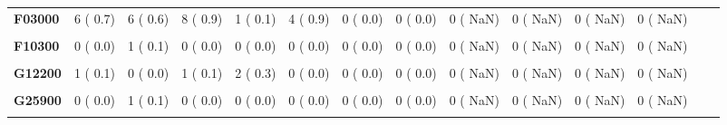\documentclass[
]{article}
\begin{document}
\begin{table}[H]
\begin{tabular}[t]{>{\raggedright\arraybackslash}p{5em}ccccccccccccc}
\textbf{F03000} & 6 (  0.7) & 6 (  0.6) & 8 (  0.9) & 1 (  0.1) & 4 (  0.9) & 0 (  0.0) & 0 (  0.0) & 0 (  NaN) & 0 (  NaN) & 0 (  NaN) & 0 (  NaN) &  & \\
\textbf{\cellcolor{gray!10}{F05900}} & \cellcolor{gray!10}{1 (  0.1)} & \cellcolor{gray!10}{0 (  0.0)} & \cellcolor{gray!10}{0 (  0.0)} & \cellcolor{gray!10}{0 (  0.0)} & \cellcolor{gray!10}{0 (  0.0)} & \cellcolor{gray!10}{0 (  0.0)} & \cellcolor{gray!10}{0 (  0.0)} & \cellcolor{gray!10}{0 (  NaN)} & \cellcolor{gray!10}{0 (  NaN)} & \cellcolor{gray!10}{0 (  NaN)} & \cellcolor{gray!10}{0 (  NaN)} & \cellcolor{gray!10}{} & \cellcolor{gray!10}{}\\
\textbf{F10300} & 0 (  0.0) & 1 (  0.1) & 0 (  0.0) & 0 (  0.0) & 0 (  0.0) & 0 (  0.0) & 0 (  0.0) & 0 (  NaN) & 0 (  NaN) & 0 (  NaN) & 0 (  NaN) &  & \\
\textbf{\cellcolor{gray!10}{G06000}} & \cellcolor{gray!10}{1 (  0.1)} & \cellcolor{gray!10}{0 (  0.0)} & \cellcolor{gray!10}{0 (  0.0)} & \cellcolor{gray!10}{0 (  0.0)} & \cellcolor{gray!10}{0 (  0.0)} & \cellcolor{gray!10}{0 (  0.0)} & \cellcolor{gray!10}{0 (  0.0)} & \cellcolor{gray!10}{0 (  NaN)} & \cellcolor{gray!10}{0 (  NaN)} & \cellcolor{gray!10}{0 (  NaN)} & \cellcolor{gray!10}{0 (  NaN)} & \cellcolor{gray!10}{} & \cellcolor{gray!10}{}\\
\textbf{G12200} & 1 (  0.1) & 0 (  0.0) & 1 (  0.1) & 2 (  0.3) & 0 (  0.0) & 0 (  0.0) & 0 (  0.0) & 0 (  NaN) & 0 (  NaN) & 0 (  NaN) & 0 (  NaN) &  & \\
\textbf{\cellcolor{gray!10}{G20000}} & \cellcolor{gray!10}{3 (  0.3)} & \cellcolor{gray!10}{1 (  0.1)} & \cellcolor{gray!10}{0 (  0.0)} & \cellcolor{gray!10}{1 (  0.1)} & \cellcolor{gray!10}{1 (  0.2)} & \cellcolor{gray!10}{0 (  0.0)} & \cellcolor{gray!10}{0 (  0.0)} & \cellcolor{gray!10}{0 (  NaN)} & \cellcolor{gray!10}{0 (  NaN)} & \cellcolor{gray!10}{0 (  NaN)} & \cellcolor{gray!10}{0 (  NaN)} & \cellcolor{gray!10}{} & \cellcolor{gray!10}{}\\
\textbf{G25900} & 0 (  0.0) & 1 (  0.1) & 0 (  0.0) & 0 (  0.0) & 0 (  0.0) & 0 (  0.0) & 0 (  0.0) & 0 (  NaN) & 0 (  NaN) & 0 (  NaN) & 0 (  NaN) &  & \\
\textbf{\cellcolor{gray!10}{G30900}} & \cellcolor{gray!10}{4 (  0.4)} & \cellcolor{gray!10}{0 (  0.0)} & \cellcolor{gray!10}{3 (  0.3)} & \cellcolor{gray!10}{5 (  0.7)} & \cellcolor{gray!10}{1 (  0.2)} & \cellcolor{gray!10}{0 (  0.0)} & \cellcolor{gray!10}{0 (  0.0)} & \cellcolor{gray!10}{0 (  NaN)} & \cellcolor{gray!10}{0 (  NaN)} & \cellcolor{gray!10}{0 (  NaN)} & \cellcolor{gray!10}{0 (  NaN)} & \cellcolor{gray!10}{} & \cellcolor{gray!10}{}\\

\end{tabular}
\end{table}
\end{document}
